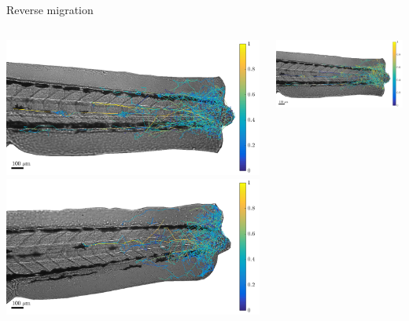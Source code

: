 \documentclass[mathserif,11pt]{beamer}
\begin{document}
\begin{frame}{Reverse migration}
\begin{columns}
	\begin{column}{0.31\textwidth}
		\vspace{-0.2cm}
		\includegraphics[scale=0.137]{Figures/mode1_rev2.png}\vfil
		\vspace{0.2cm}
		\includegraphics[scale=0.137]{Figures/mode1_rev9.png}
	\end{column}
	\begin{column}{0.31\textwidth}
		\vspace{-0.2cm}
		\includegraphics[scale=0.137]{Figures/mode2_rev2.png}\vfil

\end{column}
\end{columns}
\end{frame}
\end{document}
